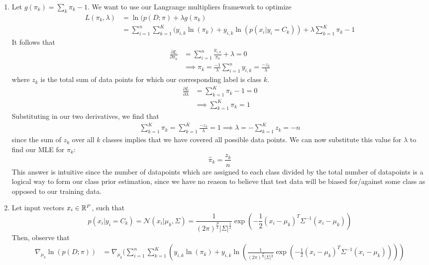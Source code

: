 \documentclass[submit]{harvardml}
\begin{document}
\begin{enumerate}
    \item
    Let $g(\pi_k) = \sum_k \pi_k - 1$. We want to use our Langrange multipliers framework to optimize 
    \begin{align}
        L(\pi_k, \lambda) &= \ln(p(D; \pi) + \lambda g(\pi_k) \\
        &= \sum_{i=1}^n \sum_{k=1}^K (y_{i,k}\ln(\pi_k) + y_{i,k}\ln(p(x_i | y_i = C_k)) + \lambda \sum_{k=1}^K \pi_k - 1
    \end{align}
     It follows that
     \begin{align}
         \frac{\partial L}{\partial\pi_k}&= \sum_{i=1}^n \frac{y_{i,k}}{\pi_k} + \lambda = 0 \\
         &\implies  \pi_k = \frac{-1}{\lambda}\sum_{i=1}^n y_{i,k} =  \frac{-z_k}{\lambda}
     \end{align}
     where $z_k$ is the total sum of data points for which our corresponding label is class $k$.
     \begin{align}
         \frac{\partial L}{\partial\lambda}&= \sum_{k=1}^K \pi_k - 1 = 0 \\
         &\implies  \sum_{k=1}^K \pi_k = 1
     \end{align}
     Substituting in our two derivatives, we find that
     \begin{align}
         \sum_{k=1}^K \pi_k = \sum_{k=1}^K \frac{-z_k}{\lambda} = 1 \implies \lambda = -\sum_{k=1}^K z_k = -n
     \end{align}
     since the sum of $z_k$ over all $k$ classes implies that we have covered all possible data points. We can now substitute this value for $\lambda$ to find our MLE for $\pi_k$:
     $$\hat\pi_k = \frac{z_k}{n}$$
     This answer is intuitive since the number of datapoints which are assigned to each class divided by the total number of datapoints is a logical way to form our class prior estimation, since we have no reason to believe that test data will be biased for/against some class as opposed to our training data. 
     \item Let input vectors $x_i \in \mathbb{R}^P$, such that $$p(x_i | y_i = C_k) = \mathcal{N}(x_i |  \mu_k, \Sigma) = \frac{1}{(2\pi)^{\frac{P}{2}}|\Sigma|^\frac{1}{2}}\exp(-\frac{1}{2}(x_i- \mu_k)^T\Sigma^{-1}(x_i-\mu_k))$$
     Then, observe that
     \begin{align}
         \nabla_{\mu_k}\ln(p(D;\pi)) &= \nabla_{\mu_k}(\sum_{i=1}^n \sum_{k=1}^K (y_{i,k}\ln(\pi_k) + y_{i,k}\ln(\frac{1}{(2\pi)^{\frac{P}{2}}|\Sigma|^\frac{1}{2}}\exp(-\frac{1}{2}(x_i- \mu_k)^T\Sigma^{-1}(x_i-\mu_k)))) \\

\end{align}
\end{enumerate}
\end{document}
